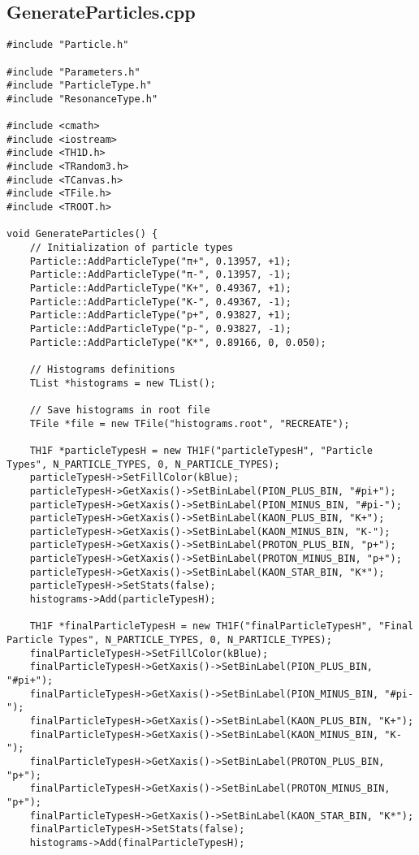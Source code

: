 \documentclass{article}
\begin{document}
\subsection*{GenerateParticles.cpp}
\begin{verbatim}
#include "Particle.h"

#include "Parameters.h"
#include "ParticleType.h"
#include "ResonanceType.h"

#include <cmath>
#include <iostream>
#include <TH1D.h>
#include <TRandom3.h>
#include <TCanvas.h>
#include <TFile.h>
#include <TROOT.h>

void GenerateParticles() {
    // Initialization of particle types
    Particle::AddParticleType("π+", 0.13957, +1);
    Particle::AddParticleType("π-", 0.13957, -1);
    Particle::AddParticleType("K+", 0.49367, +1);
    Particle::AddParticleType("K-", 0.49367, -1);
    Particle::AddParticleType("p+", 0.93827, +1);
    Particle::AddParticleType("p-", 0.93827, -1);
    Particle::AddParticleType("K*", 0.89166, 0, 0.050);

    // Histograms definitions
    TList *histograms = new TList();
    
    // Save histograms in root file
    TFile *file = new TFile("histograms.root", "RECREATE");

    TH1F *particleTypesH = new TH1F("particleTypesH", "Particle Types", N_PARTICLE_TYPES, 0, N_PARTICLE_TYPES);
    particleTypesH->SetFillColor(kBlue);
    particleTypesH->GetXaxis()->SetBinLabel(PION_PLUS_BIN, "#pi+");
    particleTypesH->GetXaxis()->SetBinLabel(PION_MINUS_BIN, "#pi-");
    particleTypesH->GetXaxis()->SetBinLabel(KAON_PLUS_BIN, "K+");
    particleTypesH->GetXaxis()->SetBinLabel(KAON_MINUS_BIN, "K-");
    particleTypesH->GetXaxis()->SetBinLabel(PROTON_PLUS_BIN, "p+");
    particleTypesH->GetXaxis()->SetBinLabel(PROTON_MINUS_BIN, "p+");
    particleTypesH->GetXaxis()->SetBinLabel(KAON_STAR_BIN, "K*");
    particleTypesH->SetStats(false);
    histograms->Add(particleTypesH);

    TH1F *finalParticleTypesH = new TH1F("finalParticleTypesH", "Final Particle Types", N_PARTICLE_TYPES, 0, N_PARTICLE_TYPES);
    finalParticleTypesH->SetFillColor(kBlue);
    finalParticleTypesH->GetXaxis()->SetBinLabel(PION_PLUS_BIN, "#pi+");
    finalParticleTypesH->GetXaxis()->SetBinLabel(PION_MINUS_BIN, "#pi-");
    finalParticleTypesH->GetXaxis()->SetBinLabel(KAON_PLUS_BIN, "K+");
    finalParticleTypesH->GetXaxis()->SetBinLabel(KAON_MINUS_BIN, "K-");
    finalParticleTypesH->GetXaxis()->SetBinLabel(PROTON_PLUS_BIN, "p+");
    finalParticleTypesH->GetXaxis()->SetBinLabel(PROTON_MINUS_BIN, "p+");
    finalParticleTypesH->GetXaxis()->SetBinLabel(KAON_STAR_BIN, "K*");
    finalParticleTypesH->SetStats(false);
    histograms->Add(finalParticleTypesH);


\end{verbatim}
\end{document}
